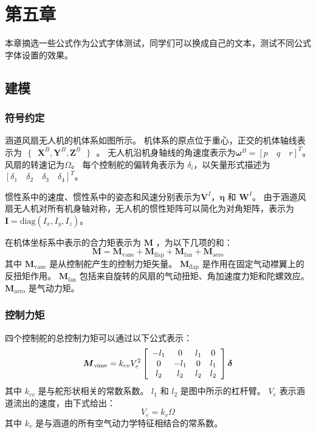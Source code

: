 \chapter{第五章}
本章摘选一些公式作为公式字体测试，同学们可以换成自己的文本，测试不同公式字体设置的效果。

\section{建模}
\label{sec:1}
\subsection{符号约定}
涵道风扇无人机的机体系如图所示。 机体系的原点位于重心，正交的机体轴线表示为$\text{ }\!\!\{\!\!\text{ }{\boldsymbol{X}^{B}},{\boldsymbol{Y}^{B}},{\boldsymbol{Z}^{B}}\text{ }\!\!\}\!\!\text{ }$。 无人机沿机身轴线的角速度表示为${{\boldsymbol{\omega }}^{B}}=[p \quad q \quad r]^{T}$。风扇的转速记为$\Omega$。 每个控制舵的偏转角表示为 ${{\delta }_{i}}$，以矢量形式描述为$[{{\delta }_{1}} \quad {{\delta }_{2}} \quad {{\delta }_{3}} \quad {{\delta }_{4}}]^T$。



惯性系中的速度、惯性系中的姿态和风速分别表示为${{\boldsymbol{V}}^{I}}$，$\boldsymbol{\eta }$ 和 ${{\boldsymbol{W}}^{I}}$。 
由于涵道风扇无人机对所有机身轴对称，无人机的惯性矩阵可以简化为对角矩阵，表示为 $ \boldsymbol{I}=\text{diag}({{I}_{x} },{{I}_{y}},{{I}_{z}}) $。

在机体坐标系中表示的合力矩表示为 $\boldsymbol M$ ，为以下几项的和：
\begin{equation}
	{\boldsymbol{M}} = {{\boldsymbol{M}}_\text{vane}} + \boldsymbol{M}_{\text{flap}} + {\boldsymbol{M}}_{\text{fan}} + {\boldsymbol{M}}_{\text{aero}}
	\label{eq_1}
\end{equation}
其中 $ {{\boldsymbol{M}}_\text{vane}} $ 是从控制舵产生的控制力矩矢量。 $ \boldsymbol{M}_{\text{flap}} $ 是作用在固定气动襟翼上的反扭矩作用。 $ {\boldsymbol{M}}_{\text{fan}} $ 包括来自旋转的风扇的气动扭矩、角加速度力矩和陀螺效应。 $  {\boldsymbol{M}}_{\text{aero}} $ 是气动力矩。

\subsection{控制力矩}
四个控制舵的总控制力矩可以通过以下公式表示：
\begin{equation}
{{\boldsymbol{M}}_\text{vane}} = {k_{cv}}V_e^2\left[ {\begin{array}{*{20}{c}}
	{{\rm{ - }}{l_1}}&0&{{l_1}}&0\\
	0&{{\rm{ - }}{l_1}}&0&{{l_1}}\\
	{{l_2}}&{{l_2}}&{{l_2}}&{{l_2}}
	\end{array}} \right]{\boldsymbol{\delta }}
\label{eq_2}
\end{equation}
其中 $ {{k}_{cv}} $ 是与舵形状相关的常数系数。 $ {{l}_{1}} $ 和 $ {{l}_{2}} $ 是图中所示的杠杆臂。 ${{V}_{e}}$ 表示涵道流出的速度，由下式给出：
\begin{equation}
	{V_e} = {k_v}\Omega 
	\label{eq_3}
\end{equation}
其中 $ {{k}_{v}} $ 是与涵道的所有空气动力学特征相结合的常系数。 

